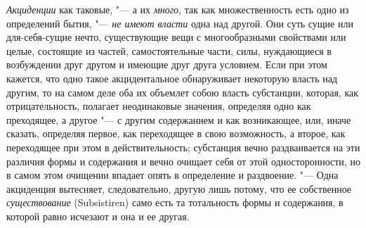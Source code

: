 {\em Акциденции} как таковые, "--- а их
{\em много}, так как множественность есть одно из
определений бытия, "--- {\em не имеют власти} одна над
другой. Они суть сущие или для-себя-сущие нечто, существующие вещи с
многообразными свойствами или целые, состоящие из частей, самостоятельные
части, силы, нуждающиеся в возбуждении друг другом и имеющие друг друга
условием. Если при этом кажется, что одно такое акцидентальное обнаруживает
некоторую власть над другим, то на самом деле оба их объемлет собою власть
субстанции, которая, как отрицательность, полагает неодинаковые значения,
определяя одно как преходящее, а другое "--- с другим содержанием и как
возникающее, или, иначе сказать, определяя первое, как переходящее в свою
возможность, а второе, как переходящее при этом в действительность;
субстанция вечно раздваивается на эти различия формы и содержания и вечно
очищает себя от этой односторонности, но в самом этом очищении впадает
опять в определение и раздвоение. "--- Одна акциденция вытесняет,
следовательно, другую лишь потому, что ее собственное
{\em существование} (Subsistiren) само есть та
тотальность формы и содержания, в которой равно исчезают и она и ее другая.

